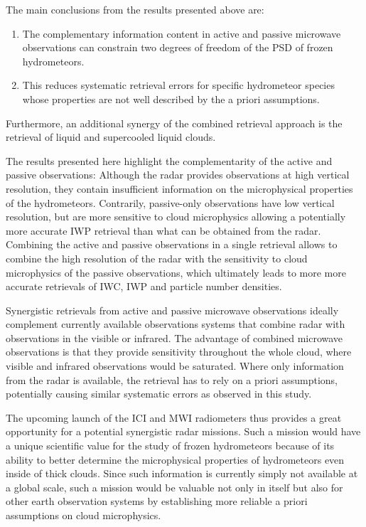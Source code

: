 \documentclass[journal abbreviation, manuscript]{copernicus}
\begin{document}
\conclusions  %
\label{sec:conclusions}

The main conclusions from the results presented above are:
\begin{enumerate}
\item The complementary information content in active and passive microwave observations
  can constrain two degrees of freedom  of the PSD of frozen hydrometeors.
\item This reduces systematic retrieval errors for specific hydrometeor species whose
  properties are not well described by the a priori assumptions.
\end{enumerate}

Furthermore, an additional synergy of the combined retrieval approach is the retrieval
of liquid and supercooled liquid clouds.

The results presented here highlight the complementarity of the active and
passive observations: Although the radar provides observations at high vertical
resolution, they contain insufficient information on the microphysical
properties of the hydrometeors. Contrarily, passive-only observations have low
vertical resolution, but are more sensitive to cloud microphysics allowing a
potentially more accurate IWP retrieval than what can be obtained from the
radar. Combining the active and passive observations in a single retrieval
allows to combine the high resolution of the radar with the sensitivity to cloud
microphysics of the passive observations, which ultimately leads to more more
accurate retrievals of IWC, IWP and particle number densities.

Synergistic retrievals from active and passive microwave observations ideally
complement currently available observations systems that combine radar with
observations in the visible or infrared. The advantage of combined microwave
observations is that they provide sensitivity throughout the whole cloud, where
visible and infrared observations would be saturated. Where only information
from the radar is available, the retrieval has to rely on a priori assumptions,
potentially causing similar systematic errors as observed in this study.

The upcoming launch of the ICI and MWI radiometers thus provides a great
opportunity for a potential synergistic radar missions. Such a mission would
have a unique scientific value for the study of frozen hydrometeors because of
its ability to better determine the microphysical properties of hydrometeors
even inside of thick clouds. Since such information is currently simply not
available at a global scale, such a mission would be valuable not only in
itself but also for other earth observation systems by establishing more
reliable a priori assumptions on cloud microphysics.
\end{document}
